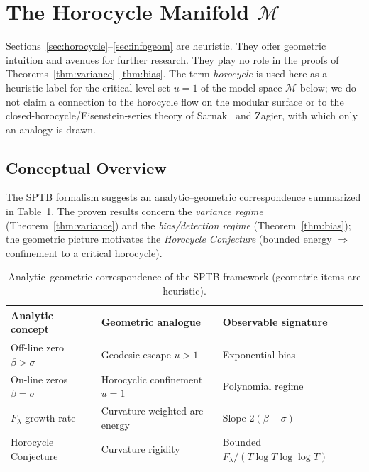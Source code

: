 
\section{The Horocycle Manifold \texorpdfstring{$\mathcal{M}$}{M}}

\begin{remark}[Status]
Sections~\ref{sec:horocycle}–\ref{sec:infogeom} are heuristic.
They offer geometric intuition and avenues for further research.
They play no role in the proofs of Theorems~\ref{thm:variance}–\ref{thm:bias}.
The term \emph{horocycle} is used here as a heuristic label for the critical
level set $u=1$ of the model space $\mathcal{M}$ below; we do not claim a
connection to the horocycle flow on the modular surface or to the
closed-horocycle/Eisenstein-series theory of Sarnak~\cite{sarnak-horocycle}
and Zagier, with which only an analogy is drawn.
\end{remark}

\subsection{Conceptual Overview}

The SPTB formalism suggests an analytic–geometric correspondence summarized in
Table~\ref{tab:roadmap4}.  The proven results concern the
\emph{variance regime} (Theorem~\ref{thm:variance}) and the
\emph{bias/detection regime} (Theorem~\ref{thm:bias}); the geometric picture
motivates the \emph{Horocycle Conjecture}
(bounded energy $\Rightarrow$ confinement to a critical horocycle).

\begin{table}[h]
\centering
\caption{Analytic–geometric correspondence of the SPTB framework (geometric items are heuristic).}
\label{tab:roadmap4}
\begin{tabular}{lll}
\toprule
Analytic concept & Geometric analogue & Observable signature \\
\midrule
Off-line zero $\beta>\sigma$ & Geodesic escape $u>1$ & Exponential bias \\
On-line zeros $\beta=\sigma$ & Horocyclic confinement $u=1$ & Polynomial regime \\
$F_\lambda$ growth rate & Curvature-weighted arc energy & Slope $2(\beta-\sigma)$ \\
Horocycle Conjecture & Curvature rigidity & Bounded $F_\lambda/(T\log T\log\log T)$ \\
\bottomrule
\end{tabular}
\end{table}

